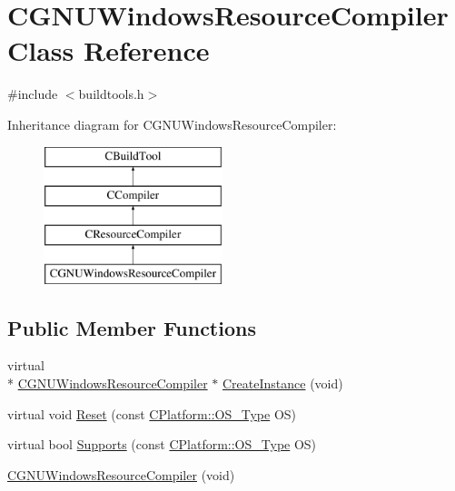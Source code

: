 \hypertarget{classCGNUWindowsResourceCompiler}{\section{C\-G\-N\-U\-Windows\-Resource\-Compiler Class Reference}
\label{classCGNUWindowsResourceCompiler}
}


{\ttfamily \#include $<$buildtools.\-h$>$}

Inheritance diagram for C\-G\-N\-U\-Windows\-Resource\-Compiler\-:\begin{figure}[H]
\begin{center}
\leavevmode
\includegraphics[height=4.000000cm]{d6/d3a/classCGNUWindowsResourceCompiler}
\end{center}
\end{figure}
\subsection*{Public Member Functions}
\begin{DoxyCompactItemize}
\item 
virtual \\*
\hyperlink{classCGNUWindowsResourceCompiler}{C\-G\-N\-U\-Windows\-Resource\-Compiler} $\ast$ \hyperlink{classCGNUWindowsResourceCompiler_a295b322f12aa797537c0ef38bed0a9a5}{Create\-Instance} (void)
\item 
virtual void \hyperlink{classCGNUWindowsResourceCompiler_add9c139a642cf1d18a3fb2978bb792c4}{Reset} (const \hyperlink{classCPlatform_a2fb735c63c53052f79629e338bb0f535}{C\-Platform\-::\-O\-S\-\_\-\-Type} O\-S)
\item 
virtual bool \hyperlink{classCGNUWindowsResourceCompiler_ac234523a2d9575abe309aa1814cf957d}{Supports} (const \hyperlink{classCPlatform_a2fb735c63c53052f79629e338bb0f535}{C\-Platform\-::\-O\-S\-\_\-\-Type} O\-S)
\item 
\hyperlink{classCGNUWindowsResourceCompiler_a70b137be8c68b0c1394b03901e4d1635}{C\-G\-N\-U\-Windows\-Resource\-Compiler} (void)
\end{DoxyCompactItemize}
